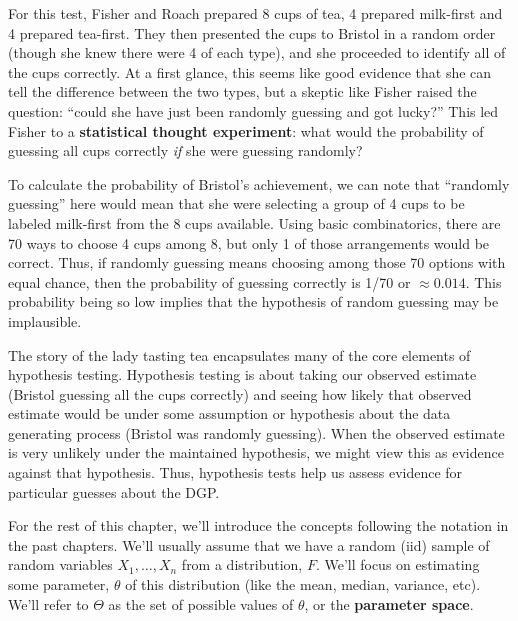 \documentclass[
  letterpaper,
  DIV=11,
  numbers=noendperiod]{scrreprt}
\theoremstyle{definition}
\theoremstyle{plain}
\theoremstyle{definition}
\theoremstyle{remark}
\begin{document}
For this test, Fisher and Roach prepared 8 cups of tea, 4 prepared
milk-first and 4 prepared tea-first. They then presented the cups to
Bristol in a random order (though she knew there were 4 of each type),
and she proceeded to identify all of the cups correctly. At a first
glance, this seems like good evidence that she can tell the difference
between the two types, but a skeptic like Fisher raised the question:
``could she have just been randomly guessing and got lucky?'' This led
Fisher to a \textbf{statistical thought experiment}: what would the
probability of guessing all cups correctly \emph{if} she were guessing
randomly?

To calculate the probability of Bristol's achievement, we can note that
``randomly guessing'' here would mean that she were selecting a group of
4 cups to be labeled milk-first from the 8 cups available. Using basic
combinatorics, there are 70 ways to choose 4 cups among 8, but only 1 of
those arrangements would be correct. Thus, if randomly guessing means
choosing among those 70 options with equal chance, then the probability
of guessing correctly is 1/70 or \(\approx 0.014\). This probability
being so low implies that the hypothesis of random guessing may be
implausible.

The story of the lady tasting tea encapsulates many of the core elements
of hypothesis testing. Hypothesis testing is about taking our observed
estimate (Bristol guessing all the cups correctly) and seeing how likely
that observed estimate would be under some assumption or hypothesis
about the data generating process (Bristol was randomly guessing). When
the observed estimate is very unlikely under the maintained hypothesis,
we might view this as evidence against that hypothesis. Thus, hypothesis
tests help us assess evidence for particular guesses about the DGP.

\begin{tcolorbox}[enhanced jigsaw, title=\textcolor{quarto-callout-note-color}{\faInfo}\hspace{0.5em}{Notation alert}, breakable, titlerule=0mm, opacityback=0, rightrule=.15mm, bottomrule=.15mm, colframe=quarto-callout-note-color-frame, coltitle=black, colbacktitle=quarto-callout-note-color!10!white, bottomtitle=1mm, toptitle=1mm, colback=white, arc=.35mm, opacitybacktitle=0.6, toprule=.15mm, leftrule=.75mm, left=2mm]

For the rest of this chapter, we'll introduce the concepts following the
notation in the past chapters. We'll usually assume that we have a
random (iid) sample of random variables \(X_1, \ldots, X_n\) from a
distribution, \(F\). We'll focus on estimating some parameter,
\(\theta\) of this distribution (like the mean, median, variance, etc).
We'll refer to \(\Theta\) as the set of possible values of \(\theta\),
or the \textbf{parameter space}.

\end{tcolorbox}
\end{document}
